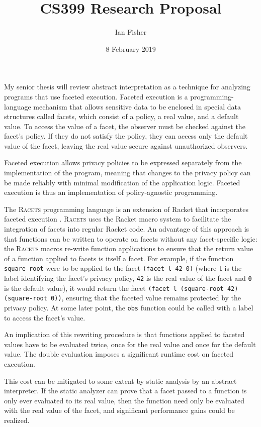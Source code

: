 \documentclass{article}
\title{CS399 Research Proposal}
\author{Ian Fisher}
\date{8 February 2019}
\begin{document}
\maketitle

My senior thesis will review abstract interpretation as a technique for analyzing programs that use faceted execution. Faceted execution is a programming-language mechanism that allows sensitive data to be enclosed in special data structures called facets, which consist of a policy, a real value, and a default value. To access the value of a facet, the observer must be checked against the facet's policy. If they do not satisfy the policy, they can access only the default value of the facet, leaving the real value secure against unauthorized observers.

Faceted execution allows privacy policies to be expressed separately from the implementation of the program, meaning that changes to the privacy policy can be made reliably with minimal modification of the application logic. Faceted execution is thus an implementation of policy-agnostic programming.

The \textsc{Racets} programming language is an extension of Racket that incorporates faceted execution \cite{racets}. \textsc{Racets} uses the Racket macro system to facilitate the integration of facets into regular Racket code. An advantage of this approach is that functions can be written to operate on facets without any facet-specific logic: the \textsc{Racets} macros re-write function applications to ensure that the return value of a function applied to facets is itself a facet. For example, if the function \texttt{square-root} were to be applied to the facet \texttt{(facet l 42 0)} (where \texttt{l} is the label identifying the facet's privacy policy, \texttt{42} is the real value of the facet and \texttt{0} is the default value), it would return the facet \texttt{(facet l (square-root 42) (square-root 0))}, ensuring that the faceted value remains protected by the privacy policy. At some later point, the \texttt{obs} function could be called with a label to access the facet's value.

An implication of this rewriting procedure is that functions applied to faceted values have to be evaluated twice, once for the real value and once for the default value. The double evaluation imposes a significant runtime cost on faceted execution.

This cost can be mitigated to some extent by static analysis by an abstract interpreter. If the static analyzer can prove that a facet passed to a function is only ever evaluated to its real value, then the function need only be evaluated with the real value of the facet, and significant performance gains could be realized.
\end{document}
